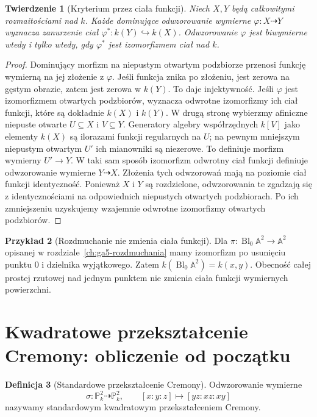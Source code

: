 \documentclass[11pt,a4paper,openany]{report}
\numberwithin{equation}{section}
\theoremstyle{plain}
\newtheorem{twierdzenie}{Twierdzenie}[section]
\theoremstyle{definition}
\newtheorem{definicja}[twierdzenie]{Definicja}
\newtheorem{przyklad}[twierdzenie]{Przykład}
\theoremstyle{remark}
\newcommand{\A}{\mathbb A}
\newcommand{\PP}{\mathbb P}
\begin{document}
\begin{twierdzenie}[Kryterium przez ciała funkcji]
\label{tw:ga8-function-fields}
Niech $X,Y$ będą całkowitymi rozmaitościami nad $k$.
Każde dominujące odwzorowanie wymierne
$\varphi:X\dashrightarrow Y$ wyznacza zanurzenie ciał
$\varphi^*:k(Y)\hookrightarrow k(X)$.
Odwzorowanie $\varphi$ jest biwymierne wtedy i tylko
wtedy, gdy $\varphi^*$ jest izomorfizmem ciał nad $k$.
\end{twierdzenie}
\begin{proof}
Dominujący morfizm na niepustym otwartym podzbiorze
przenosi funkcję wymierną na jej złożenie z $\varphi$.
Jeśli funkcja znika po złożeniu, jest zerowa na gęstym
obrazie, zatem jest zerowa w $k(Y)$. To daje injektywność.
Jeśli $\varphi$ jest izomorfizmem otwartych podzbiorów,
wyznacza odwrotne izomorfizmy ich ciał funkcji, które
są dokładnie $k(X)$ i $k(Y)$.
W drugą stronę wybierzmy afiniczne niepuste otwarte
$U\subseteq X$ i $V\subseteq Y$. Generatory algebry
współrzędnych $k[V]$ jako elementy $k(X)$ są ilorazami
funkcji regularnych na $U$; na pewnym mniejszym
niepustym otwartym $U'$ ich mianowniki są niezerowe.
To definiuje morfizm wymierny $U'\to Y$.
W taki sam sposób izomorfizm odwrotny ciał funkcji
definiuje odwzorowanie wymierne $Y\dashrightarrow X$.
Złożenia tych odwzorowań mają na poziomie ciał funkcji
identyczność. Ponieważ $X$ i $Y$ są rozdzielone,
odwzorowania te zgadzają się z identycznościami na
odpowiednich niepustych otwartych podzbiorach.
Po ich zmniejszeniu uzyskujemy wzajemnie odwrotne
izomorfizmy otwartych podzbiorów.
\end{proof}

\begin{przyklad}[Rozdmuchanie nie zmienia ciała funkcji]
Dla $\pi:\operatorname{Bl}_0\A^2\to\A^2$ opisanej
w rozdziale~\ref{ch:ga5-rozdmuchania} mamy izomorfizm
po usunięciu punktu $0$ i dzielnika wyjątkowego.
Zatem $k(\operatorname{Bl}_0\A^2)=k(x,y)$.
Obecność całej prostej rzutowej nad jednym punktem
nie zmienia ciała funkcji wymiernych powierzchni.
\end{przyklad}

\section{Kwadratowe przekształcenie Cremony: obliczenie od początku}
\label{sec:ga8-cremona}

\begin{definicja}[Standardowe przekształcenie Cremony]
\label{def:ga8-cremona}
Odwzorowanie wymierne
\[
\sigma:\PP^2_k\dashrightarrow\PP^2_k,\qquad
[x:y:z]\longmapsto[yz:xz:xy]
\]
nazywamy standardowym kwadratowym przekształceniem Cremony.
\end{definicja}
\end{document}
